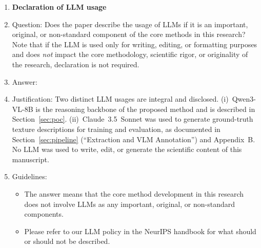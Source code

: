 \begin{enumerate}
\item {\bf Declaration of LLM usage}
    \item[] Question: Does the paper describe the usage of LLMs if it is an important, original, or non-standard component of the core methods in this research? Note that if the LLM is used only for writing, editing, or formatting purposes and does \emph{not} impact the core methodology, scientific rigor, or originality of the research, declaration is not required.
    \item[] Answer: \answerYes{}
    \item[] Justification: Two distinct LLM usages are integral and disclosed. (i)~Qwen3-VL-8B is the reasoning backbone of the proposed method and is described in Section~\ref{sec:poc}. (ii)~Claude~3.5~Sonnet was used to generate ground-truth texture descriptions for training and evaluation, as documented in Section~\ref{sec:pipeline} (``Extraction and VLM Annotation'') and Appendix~B. No LLM was used to write, edit, or generate the scientific content of this manuscript.
    \item[] Guidelines:
    \begin{itemize}
        \item The answer \answerNA{} means that the core method development in this research does not involve LLMs as any important, original, or non-standard components.
        \item Please refer to our LLM policy in the NeurIPS handbook for what should or should not be described.
    \end{itemize}

\end{enumerate}
